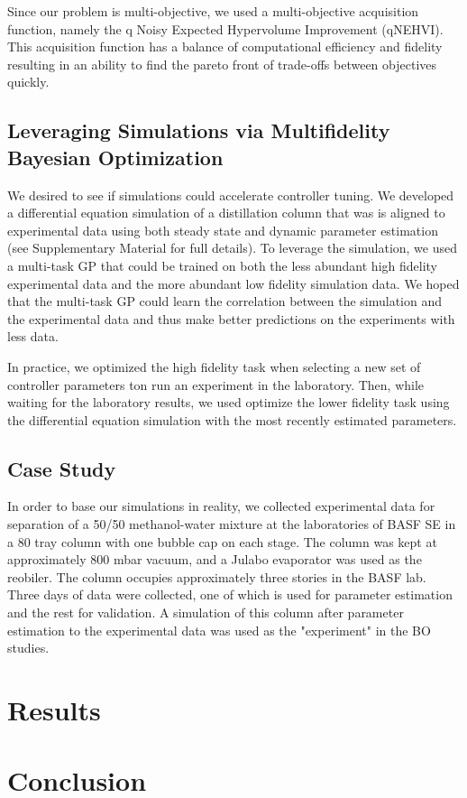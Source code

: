 Since our problem is multi-objective, we used a multi-objective acquisition function, namely the q Noisy Expected Hypervolume Improvement (qNEHVI). This acquisition function has a balance of computational efficiency and fidelity resulting in an ability to find the pareto front of trade-offs between objectives quickly. 

\subsection{Leveraging Simulations via Multifidelity Bayesian Optimization}

We desired to see if simulations could accelerate controller tuning. We developed a differential equation simulation of a distillation column that was is aligned to experimental data using both steady state and dynamic parameter estimation (see Supplementary Material for full details). To leverage the simulation, we used a multi-task GP that could be trained on both the less abundant high fidelity experimental data and the more abundant low fidelity simulation data. We hoped that the multi-task GP could learn the correlation between the simulation and the experimental data and thus make better predictions on the experiments with less data.

In practice, we optimized the high fidelity task when selecting  a new set of controller parameters ton run an experiment in the laboratory. Then, while waiting for the laboratory results, we used optimize the lower fidelity task using the differential equation simulation with the most recently estimated parameters. 

\subsection{Case Study}

In order to base our simulations in reality, we collected experimental data for separation of a 50/50 methanol-water mixture at the laboratories of BASF SE in a 80 tray column with one bubble cap on each stage. The column was kept at approximately 800 mbar vacuum, and a Julabo evaporator was used as the reobiler. The column occupies approximately three stories in the BASF lab.  Three days of data were collected, one of which is used for parameter estimation and the rest for validation. A simulation of this column after parameter estimation to the experimental data was used as the "experiment" in the BO studies.

\section{Results}

\section{Conclusion}